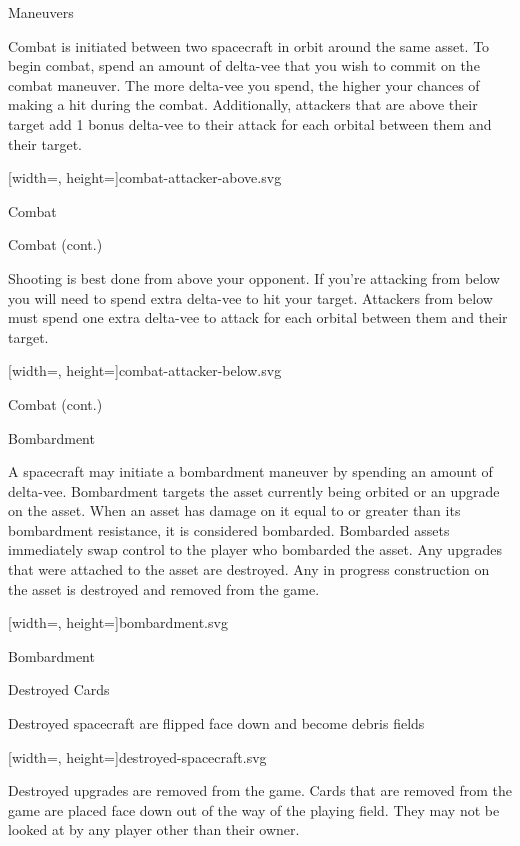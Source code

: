 \documentclass[twoside]{minimal}
\newenvironment{section}[1]
{\renewcommand{\title}{\begin{center} \fontsize{24.88}{32}\selectfont #1 \end{center}} \ignorespaces}
{\clearpage \ignorespacesafterend}
\newenvironment{supersection}[1]
{
\renewcommand{\title}{\begin{center} \fontsize{24.88}{32}\selectfont #1 \end{center}}
\renewenvironment{section}[1]
 {\title \renewcommand{\title}{\begin{flushleft} \fontsize{20.74}{28}\selectfont ##1 \end{flushleft}} \ignorespaces}
 {\clearpage \ignorespacesafterend}
\ignorespaces
}
{\clearpage \ignorespacesafterend}
\newcommand{\full}[3]{
\begin{diagram}
    \begin{center}
    {#2[width=\textwidth, height=\textheight]{#1}}
    \caption*{#3}
    \end{center}
\end{diagram}
}
\newcommand{\fullsvg}[2]{\full{#1}{}{#2}}
\begin{document}
\begin{supersection}{Maneuvers}
\begin{section}{Combat}
        Combat is initiated between two spacecraft in orbit around the same asset.
        To begin combat, spend an amount of delta-vee that you wish to commit on the combat maneuver.
        The more delta-vee you spend, the higher your chances of making a hit during the combat.
        Additionally, attackers that are above their target add 1 bonus delta-vee to their attack for each orbital between them and their target.

        \fullsvg{combat-attacker-above.svg}{Combat with the attacker above its target.}
    \end{section}

    \begin{section}{Combat (cont.)}
        \title

        Shooting is best done from above your opponent.
        If you're attacking from below you will need to spend extra delta-vee to hit your target.
        Attackers from below must spend one extra delta-vee to attack for each orbital between them and their target.

        \fullsvg{combat-attacker-below.svg}{Combat with the attacker below its target.}
    \end{section}

    \begin{section}{Bombardment}
        \title

        A spacecraft may initiate a bombardment maneuver by spending an amount of delta-vee.
        Bombardment targets the asset currently being orbited or an upgrade on the asset.
        When an asset has damage on it equal to or greater than its bombardment resistance, it is considered bombarded.
        Bombarded assets immediately swap control to the player who bombarded the asset.
        Any upgrades that were attached to the asset are destroyed.
        Any in progress construction on the asset is destroyed and removed from the game.

        \fullsvg{bombardment.svg}{Asset bombardment.}

    \end{section}
\end{supersection}

\begin{section}{Destroyed Cards}
\title

Destroyed spacecraft are flipped face down and become debris fields

\fullsvg{destroyed-spacecraft.svg}{Flipping a spacecraft when it is destroyed}

Destroyed upgrades are removed from the game.
Cards that are removed from the game are placed face down out of the way of the playing field.
They may not be looked at by any player other than their owner.
\end{section}
\end{document}
